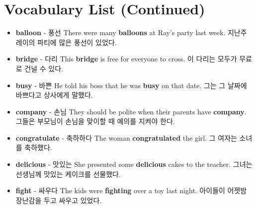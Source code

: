 \documentclass{article}
\begin{document}
\section*{Vocabulary List (Continued)}
\begin{addmargin}[1em]{1em}
    \begin{itemize}
        \item \fontsize{12pt}{14pt}\selectfont \textbf{balloon} - 풍선 \newline
        There were many \textbf{balloons} at Ray's party last week. \newline
        지난주 레이의 파티에 많은 풍선이 있었다.
        
        \item \fontsize{12pt}{14pt}\selectfont \textbf{bridge} - 다리 \newline
        This \textbf{bridge} is free for everyone to cross. \newline
        이 다리는 모두가 무료로 건널 수 있다.
        
        \item \fontsize{12pt}{14pt}\selectfont \textbf{busy} - 바쁜 \newline
        He told his boss that he was \textbf{busy} on that date. \newline
        그는 그 날짜에 바쁘다고 상사에게 말했다.
        
        \item \fontsize{12pt}{14pt}\selectfont \textbf{company} - 손님 \newline
        They should be polite when their parents have \textbf{company}. \newline
        그들은 부모님이 손님을 맞이할 때 예의를 지켜야 한다.
        
        \item \fontsize{12pt}{14pt}\selectfont \textbf{congratulate} - 축하하다 \newline
        The woman \textbf{congratulated} the girl. \newline
        그 여자는 소녀를 축하했다.
        
        \item \fontsize{12pt}{14pt}\selectfont \textbf{delicious} - 맛있는 \newline
        She presented some \textbf{delicious} cakes to the teacher. \newline
        그녀는 선생님께 맛있는 케이크를 선물했다.
        
        \item \fontsize{12pt}{14pt}\selectfont \textbf{fight} - 싸우다 \newline
        The kids were \textbf{fighting} over a toy last night. \newline
        아이들이 어젯밤 장난감을 두고 싸우고 있었다.
        

\end{itemize}
\end{addmargin}
\end{document}
